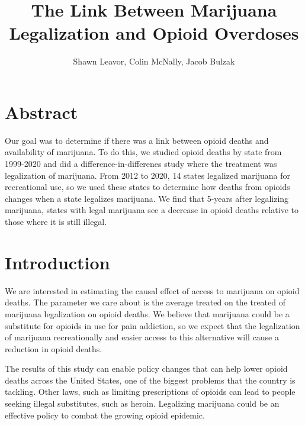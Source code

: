 \documentclass{article}
\title{The Link Between Marijuana Legalization and Opioid Overdoses} %
\author{Shawn Leavor, Colin McNally, Jacob Bulzak} %
\begin{document}
\maketitle %



\section*{Abstract} %

Our goal was to determine if there was a link between opioid deaths and availability of marijuana. To do this, we studied opioid deaths by state from 1999-2020 and did a difference-in-differenes study where the treatment was legalization of marijuana. From 2012 to 2020, 14 states legalized marijuana for recreational use, so we used these states to determine how deaths from opioids changes when a state legalizes marijuana. We find that 5-years after legalizing marijuana, states with legal marijuana see a decrease in opioid deaths relative to those where it is still illegal. 

\section*{Introduction} %

We are interested in estimating the causal effect of access to marijuana on opioid deaths. The parameter we care about is the average treated on the treated of marijuana legalization on opioid deaths. We believe that marijuana could be a substitute for opioids in use for pain addiction, so we expect that the legalization of marijuana recreationally and easier access to this alternative will cause a reduction in opioid deaths.

The results of this study can enable policy changes that can help lower opioid deaths across the United States, one of the biggest problems that the country is tackling. Other laws, such as limiting prescriptions of opioids can lead to people seeking illegal substitutes, such as heroin. Legalizing marijuana could be an effective policy to combat the growing opioid epidemic. 

\end{document}
